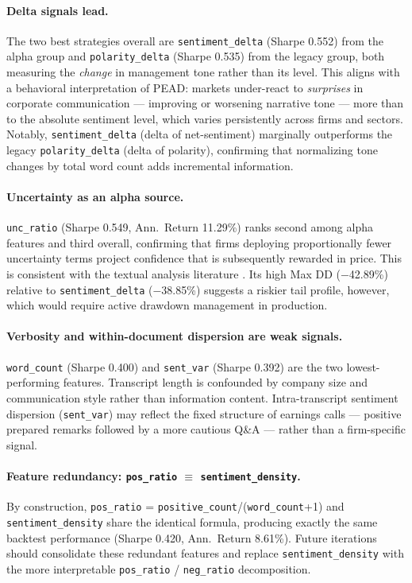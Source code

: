 \documentclass{article}
\begin{document}
\paragraph{Delta signals lead.}
The two best strategies overall are \texttt{sentiment\_delta} (Sharpe 0.552) from the alpha group and \texttt{polarity\_delta} (Sharpe 0.535) from the legacy group, both measuring the \emph{change} in management tone rather than its level. This aligns with a behavioral interpretation of PEAD: markets under-react to \emph{surprises} in corporate communication — improving or worsening narrative tone — more than to the absolute sentiment level, which varies persistently across firms and sectors. Notably, \texttt{sentiment\_delta} (delta of net-sentiment) marginally outperforms the legacy \texttt{polarity\_delta} (delta of polarity), confirming that normalizing tone changes by total word count adds incremental information.

\paragraph{Uncertainty as an alpha source.}
\texttt{unc\_ratio} (Sharpe 0.549, Ann.\ Return 11.29\%) ranks second among alpha features and third overall, confirming that firms deploying proportionally fewer uncertainty terms project confidence that is subsequently rewarded in price. This is consistent with the textual analysis literature \cite{kearney2014}. Its high Max DD ($-$42.89\%) relative to \texttt{sentiment\_delta} ($-$38.85\%) suggests a riskier tail profile, however, which would require active drawdown management in production.

\paragraph{Verbosity and within-document dispersion are weak signals.}
\texttt{word\_count} (Sharpe 0.400) and \texttt{sent\_var} (Sharpe 0.392) are the two lowest-performing features. Transcript length is confounded by company size and communication style rather than information content. Intra-transcript sentiment dispersion (\texttt{sent\_var}) may reflect the fixed structure of earnings calls — positive prepared remarks followed by a more cautious Q\&A — rather than a firm-specific signal.

\paragraph{Feature redundancy: \texttt{pos\_ratio} $\equiv$ \texttt{sentiment\_density}.}
By construction, \texttt{pos\_ratio} = \texttt{positive\_count}/(\texttt{word\_count}+1) and \texttt{sentiment\_density} share the identical formula, producing exactly the same backtest performance (Sharpe 0.420, Ann.\ Return 8.61\%). Future iterations should consolidate these redundant features and replace \texttt{sentiment\_density} with the more interpretable \texttt{pos\_ratio} / \texttt{neg\_ratio} decomposition.
\end{document}
